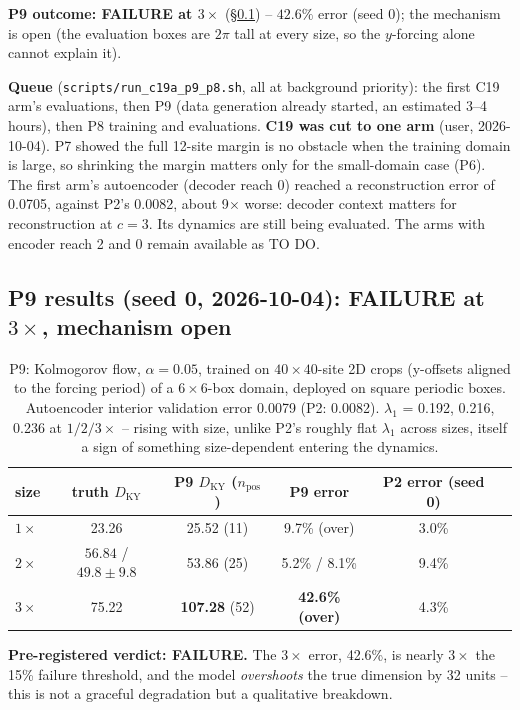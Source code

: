 \documentclass[11pt]{article}
\begin{document}
\textbf{P9 outcome: FAILURE at $3\times$} (\S\ref{sec:p9_results}) --
$42.6\%$ error (seed 0); the mechanism is open (the evaluation boxes are
$2\pi$ tall at every size, so the $y$-forcing alone cannot explain it).

\textbf{Queue} (\texttt{scripts/run\_c19a\_p9\_p8.sh}, all at
background priority): the first C19 arm's evaluations, then P9 (data
generation already started, an estimated 3--4 hours), then P8 training
and evaluations. \textbf{C19 was cut to one arm} (user, 2026-10-04).
P7 showed the full 12-site margin is no obstacle when the training
domain is large, so shrinking the margin matters only for the
small-domain case (P6). The first arm's autoencoder (decoder reach 0)
reached a reconstruction error of 0.0705, against P2's 0.0082, about
9$\times$ worse: decoder context matters for reconstruction at $c{=}3$.
Its dynamics are still being evaluated. The arms with encoder reach 2
and 0 remain available as TO DO.

\subsection{P9 results (seed 0, 2026-10-04): FAILURE at $3\times$, mechanism open}
\label{sec:p9_results}

\begin{table}[h]
\centering
\small
\begin{tabular}{lccccc}
\toprule
size & truth $D_{\mathrm{KY}}$ & P9 $D_{\mathrm{KY}}$ ($n_{\mathrm{pos}}$) & P9 error & P2 error (seed 0) \\
\midrule
$1\times$ & 23.26 & 25.52 (11) & 9.7\% (over) & 3.0\% \\
$2\times$ & $56.84$ / $49.8\pm9.8$ & 53.86 (25) & 5.2\% / 8.1\% & 9.4\% \\
$3\times$ & 75.22 & \textbf{107.28} (52) & \textbf{42.6\% (over)} & 4.3\% \\
\bottomrule
\end{tabular}
\caption{P9: Kolmogorov flow, $\alpha{=}0.05$, trained on $40\times40$-site
2D crops (y-offsets aligned to the forcing period) of a $6\times6$-box
domain, deployed on square periodic boxes. Autoencoder interior
validation error 0.0079 (P2: 0.0082). $\lambda_1$ = 0.192, 0.216, 0.236
at $1/2/3\times$ -- rising with size, unlike P2's roughly flat
$\lambda_1$ across sizes, itself a sign of something size-dependent
entering the dynamics.}
\label{tab:p9_results}
\end{table}

\textbf{Pre-registered verdict: FAILURE.} The $3\times$ error, 42.6\%,
is nearly $3\times$ the 15\% failure threshold, and the model
\emph{overshoots} the true dimension by 32 units -- this is not a
graceful degradation but a qualitative breakdown.
\end{document}
